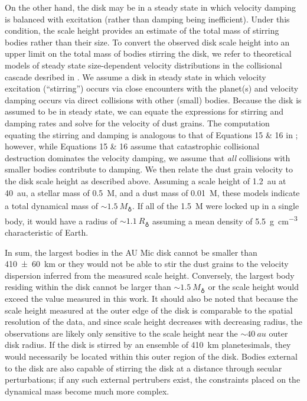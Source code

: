 \documentclass[modern]{aastex62}
\begin{document}
On the other hand, the disk may be in a steady state in which velocity damping is balanced with excitation (rather than damping being inefficient).
Under this condition, the scale height provides an estimate of the total mass of stirring bodies rather than their size.
To convert the observed disk scale height into an upper limit on the total mass of bodies stirring the disk, we refer to theoretical models of steady state size-dependent velocity distributions in the collisional cascade desribed in \citet{pan&schlichting12}.
We assume a disk in steady state in which velocity excitation (``stirring'') occurs via close encounters with the planet(s) and velocity damping occurs via direct collisions with other (small) bodies. 
Because the disk is assumed to be in steady state, we can equate the expressions for stirring and damping rates and solve for the velocity of dust grains. 
The computation equating the stirring and damping is analogous to that of Equations 15 \& 16 in \citet{pan&schlichting12}; however, while Equations 15 \& 16 assume that catastrophic collisional destruction dominates the velocity damping, we assume that \textit{all} collisions with smaller bodies contribute to damping.
We then relate the dust grain velocity to the disk scale height as described above.
Assuming a scale height of \SI{1.2}{au} at \SI{40}{au}, a stellar mass of \SI{0.5}{M_\sun}, and a dust mass of \SI{0.01}{M_\earth}, these models indicate a total dynamical mass of $\sim\SI{1.5}{M_\earth}$.
If all of the \SI{1.5}{M_\earth} were locked up in a single body, it would have a radius of $\sim \SI{1.1}{R_\earth}$ assuming a mean density of \SI{5.5}{\g.\cm^{-3}} characteristic of Earth.

In sum, the largest bodies in the AU Mic disk cannot be smaller than \SI{410 \pm 60}{km} or they would not be able to stir the dust grains to the velocity dispersion inferred from the measured scale height.
Conversely, the largest body residing within the disk cannot be larger than $\sim \SI{1.5}{M_\earth}$ or the scale height would exceed the value measured in this work.
It should also be noted that because the scale height measured at the outer edge of the disk is comparable to the spatial resolution of the data, and since scale height decreases with decreasing radius, the observations are likely only sensitive to the scale height near the $\sim \SI{40}{au}$ outer disk radius. 
If the disk is stirred by an ensemble of \SI{410}{km} planetesimals, they would necessarily be located within this outer region of the disk. 
Bodies external to the disk are also capable of stirring the disk at a distance through secular perturbations; if any such external pertrubers exist, the constraints placed on the dynamical mass become much more complex.
\end{document}

